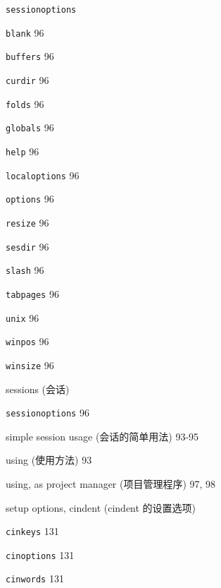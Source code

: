 \begin{multicols}{2}
\hangindent=2pc  \texttt{sessionoptions} \par
\hangindent=2pc \quad \texttt{blank} 96 \par
\hangindent=2pc \quad \texttt{buffers} 96 \par
\hangindent=2pc \quad \texttt{curdir} 96 \par
\hangindent=2pc \quad \texttt{folds} 96 \par
\hangindent=2pc \quad \texttt{globals} 96 \par
\hangindent=2pc \quad \texttt{help} 96 \par
\hangindent=2pc \quad \texttt{localoptions} 96 \par
\hangindent=2pc \quad \texttt{options} 96 \par
\hangindent=2pc \quad \texttt{resize} 96 \par
\hangindent=2pc \quad \texttt{sesdir} 96 \par
\hangindent=2pc \quad \texttt{slash} 96 \par
\hangindent=2pc \quad \texttt{tabpages} 96 \par
\hangindent=2pc \quad \texttt{unix} 96 \par
\hangindent=2pc \quad \texttt{winpos} 96 \par
\hangindent=2pc \quad \texttt{winsize} 96 \par

\hangindent=2pc  sessions (会话) \par
\hangindent=2pc \quad \texttt{sessionoptions} 96 \par
\hangindent=2pc \quad simple session usage (会话的简单用法) 93-95 \par
\hangindent=2pc \quad using (使用方法) 93 \par
\hangindent=2pc \quad using, as project manager (项目管理程序) 97, 98 \par

\hangindent=2pc  setup options, cindent (cindent 的设置选项) \par
\hangindent=2pc \quad \texttt{cinkeys} 131 \par
\hangindent=2pc \quad \texttt{cinoptions} 131 \par
\hangindent=2pc \quad \texttt{cinwords} 131 \par


\end{multicols}
